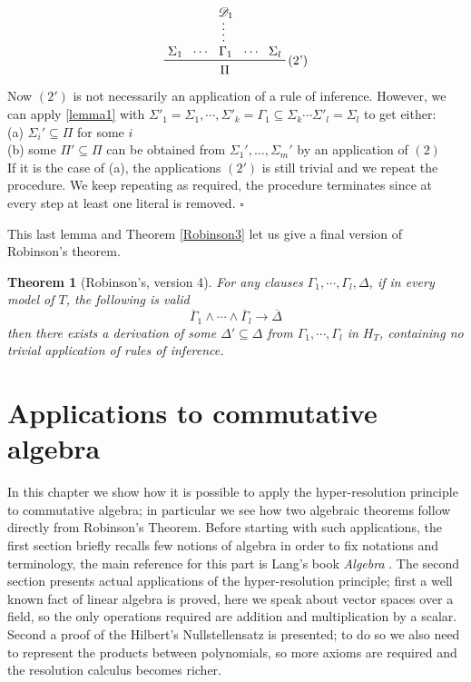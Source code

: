 \documentclass[a4paper,12pt,oneside]{book}
\newtheorem{theorem}{Theorem}[chapter]
\newcommand{\D}{\mathscr{D}}
\newcommand*{\QED}{\hfill\ensuremath{\square}}
\let\e\wedge
\begin{document}
\begin{equation*}
\prftree[r]{(2')}{\prfassumption{\Sigma_1}}{\cdots}
{\prfsummary{\D_1}{\Gamma_1}}
{\cdots}{\prfassumption{\Sigma_l}}{\Pi}
\end{equation*}
Now $(2')$ is not necessarily an application of a rule of inference. However, we can apply \ref{lemma1} with  $\Sigma'_1=\Sigma_1,\cdots, \Sigma'_k=\Gamma_1\subseteq\Sigma_k\cdots\Sigma'_l=\Sigma_l$ to get either:\\
(a) $\Sigma_i' \subseteq \Pi$ for some $i$\\
(b) some $\Pi '\subseteq\Pi$ can be obtained from $\Sigma_1 ',...,\Sigma_m '$ by an application of $(2)$\\
If it is the case of (a), the applications $(2')$ is still trivial and we repeat the procedure. We keep repeating as required, the procedure terminates since at every step at least one literal is removed. \QED



\noindent This last lemma and Theorem \ref{Robinson3}  let us give a final version of Robinson's theorem.
\begin{theorem}[{Robinson's, version 4}] \label{Robinson}
For any clauses $\Gamma_1, \cdots ,\Gamma_l , \Delta$, if in every model of $T$, the following is valid 
$$
\overline{\Gamma}_1\e\cdots\e\overline{\Gamma}_l \rightarrow \overline{\Delta}
$$
then there exists a derivation of some $\Delta' \subseteq \Delta$ from $\Gamma_1, \cdots ,\Gamma_l$ in $H_T$, containing no trivial application of rules of inference.
\end{theorem}


\chapter{Applications to commutative algebra} %
In this chapter we show how it is possible to apply the hyper-resolution principle to commutative algebra; in particular we see how two algebraic theorems follow directly from Robinson's Theorem. Before starting with such applications, the first section briefly recalls few notions of algebra in order to fix notations and terminology, the main reference for this part is Lang's book \textit{Algebra} \cite{Lang}.
The second section presents actual applications of the hyper-resolution principle; first a  well known fact of linear algebra is proved, here we speak about vector spaces over a field, so the only operations required are addition and multiplication by a scalar. 
Second a proof of the Hilbert's Nullstellensatz is presented; to do so we also need to represent the products between polynomials, so more axioms are required and the resolution calculus becomes richer.
\end{document}
